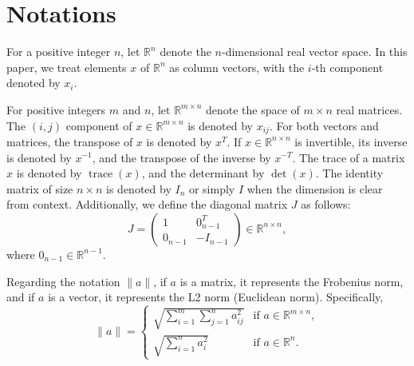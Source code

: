 \section{Notations}\label{sec:notation}


For a positive integer $n$, let $\mathbb{R}^n$ denote the $n$-dimensional real vector space.
In this paper, we treat elements $x$ of $\mathbb{R}^n$ as column vectors, with the $i$-th component denoted by $x_i$.

For positive integers $m$ and $n$, let $\mathbb{R}^{m \times n}$ denote the space of $m \times n$ real matrices.
The $(i,j)$ component of $x \in \mathbb{R}^{m \times n}$ is denoted by $x_{ij}$.
For both vectors and matrices, the transpose of $x$ is denoted by $x^T$.
If $x \in \mathbb{R}^{n \times n}$ is invertible, its inverse is denoted by $x^{-1}$, and the transpose of the inverse by $x^{-T}$.
The trace of a matrix $x$ is denoted by $\operatorname{trace}(x)$, and the determinant by $\operatorname{det}(x)$.
The identity matrix of size $n \times n$ is denoted by $I_n$ or simply $I$ when the dimension is clear from context.
Additionally, we define the diagonal matrix $J$ as follows:
\[
    J = \begin{pmatrix}
        1 & 0_{n-1}^T \\
        0_{n-1} & -I_{n-1}
    \end{pmatrix} \in \mathbb{R}^{n \times n},
\]
where $0_{n-1} \in \mathbb{R}^{n-1}$.

Regarding the notation $\|a\|$, if $a$ is a matrix, it represents the Frobenius norm, and if $a$ is a vector, it represents the L2 norm (Euclidean norm).
Specifically,
\[
\|a\| = 
\begin{cases}
    \sqrt{\sum_{i=1}^m \sum_{j=1}^n a_{ij}^2} & \text{if } a \in \mathbb{R}^{m \times n},\\
    \sqrt{\sum_{i=1}^n a_i^2} & \text{if } a \in \mathbb{R}^n.
\end{cases}
\]

